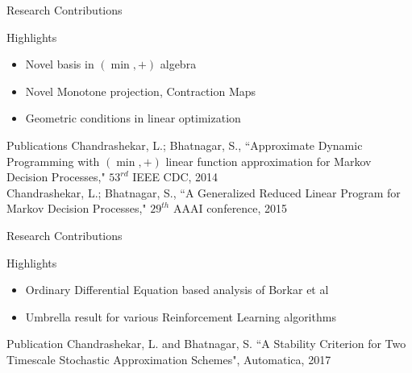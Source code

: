 \documentclass[10pt]{beamer}
\begin{document}
\begin{frame}[fragile]{Research Contributions}
\textbf{\color{orange}{Developed ADP methods with provable performance guarantees}}
\begin{block}{Highlights}
\begin{itemize}
\item Novel basis in $(\min,+)$ algebra
\item Novel Monotone projection, Contraction Maps
\item Geometric conditions in linear optimization
\end{itemize}
\end{block}

\begin{block}{Publications}
Chandrashekar, L.; Bhatnagar, S., ``Approximate Dynamic Programming with $(\min,+)$ linear function approximation for Markov Decision Processes," $53^{rd}$ IEEE CDC, 2014\\
Chandrashekar, L.; Bhatnagar, S., ``A Generalized Reduced Linear Program for Markov Decision Processes," $29^{th}$ AAAI conference, 2015
\end{block}

\end{frame}
\begin{frame}[fragile]{Research Contributions}
\textbf{\color{orange}{Provided conditions that imply stability of multi-timescale stochastic approximation algorithms}}
\begin{block}{Highlights}
\begin{itemize}
\item Ordinary Differential Equation based analysis of Borkar et al
\item Umbrella result for various Reinforcement Learning algorithms
\end{itemize}
\end{block}

\begin{block}{Publication}
Chandrashekar, L. and  Bhatnagar, S. ``A Stability Criterion for Two Timescale Stochastic Approximation Schemes",  Automatica, 2017
\end{block}
\end{frame}
\end{document}
